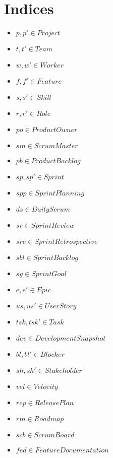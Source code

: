 \documentclass{article}
\begin{document}
\section{Indices}
\begin{itemize}
    \item $p, p' \in Project$
    \item $t, t' \in Team$
    \item $w, w' \in Worker$
    \item $f, f' \in Feature$
    \item $s, s' \in Skill$
    \item $r, r' \in Role$
    \item $po \in ProductOwner$
    \item $sm \in ScrumMaster$
    \item $pb \in ProductBacklog$
    \item $sp, sp' \in Sprint$
    \item $spp \in SprintPlanning$
    \item $ds \in DailyScrum$
    \item $sr \in SprintReview$
    \item $sre \in SprintRetrospective$
    \item $sbl \in SprintBacklog$
    \item $sg \in SprintGoal$
    \item $e, e' \in Epic$
    \item $us, us' \in UserStory$
    \item $tsk, tsk' \in Task$
    \item $dev \in DevelopmentSnapshot$
    \item $bl, bl' \in Blocker$
    \item $sh, sh' \in Stakeholder$
    \item $vel \in Velocity$
    \item $rep \in ReleasePlan$
    \item $rm \in Roadmap$
    \item $scb \in ScrumBoard$
    \item $fed \in FeatureDocumentation$
\end{itemize}
\end{document}
